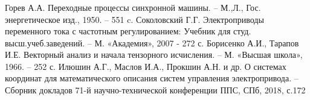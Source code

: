 \begin{frame}
\frametitle{}
	\vspace{-0.4cm}
	\small{
\begin{thebibliography}{7}
	Горев А.А. Переходные процессы синхронной машины. -- М.,Л., Гос. энергетическое изд., 1950. -- 551 c.
        Соколовский Г.Г. Электроприводы переменного тока с частотным регулированием: Учебник для студ. высш.учеб.заведений.
                -- М. «Академия», 2007 - 272 с.
	Борисенко А.И., Тарапов И.Е. Векторный анализ и начала тензорного исчисления. -- М. «Высшая школа», 1966. -- 252 с.
        Илюшин А.Г., Маслов И.А., Прокшин А.Н. и др. О системах координат для математического описания систем управления электропривода. --
                Сборник докладов 71-й научно-технической конференции ППС, СПб, 2018, с.172
	
%

\end{thebibliography}
}
\end{frame}



